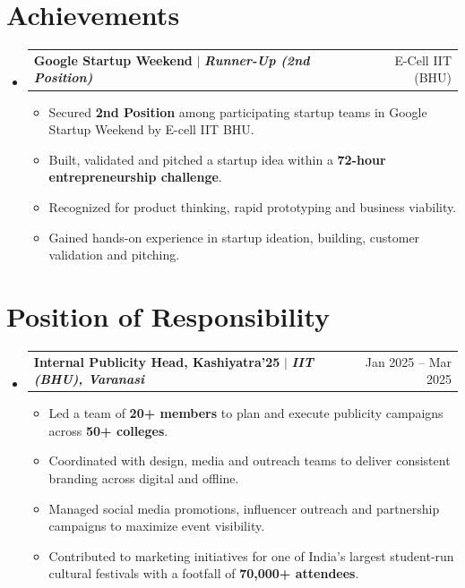 \documentclass[letterpaper,11pt]{article}
\makeatletter
\newcommand{\resumeItem}[1]{
  \item\small{
    {#1 \vspace{-2pt}}
  }
}
\newcommand{\resumeProjectHeading}[2]{
    \item
    \begin{tabular*}{0.97\textwidth}{l@{\extracolsep{\fill}}r}
      \small#1 & #2 \\
    \end{tabular*}\vspace{-7pt}
}
\newcommand{\resumeSubHeadingListStart}{\begin{itemize}[leftmargin=0.15in, label={}]}
\newcommand{\resumeSubHeadingListEnd}{\end{itemize}}
\newcommand{\resumeItemListStart}{\begin{itemize}}
\newcommand{\resumeItemListEnd}{\end{itemize}\vspace{-5pt}}
\makeatother
\begin{document}
\section{Achievements}
\resumeSubHeadingListStart

\resumeProjectHeading
{\textbf{\large{Google Startup Weekend}} $|$ \emph{\textbf{Runner-Up (2nd Position)}}}
{E-Cell IIT (BHU)}

\resumeItemListStart
    \resumeItem{Secured \textbf{2nd Position} among participating startup teams in Google Startup Weekend by E-cell IIT BHU.}
    \resumeItem{Built, validated and pitched a startup idea within a \textbf{72-hour entrepreneurship challenge}.}
    \resumeItem{Recognized for product thinking, rapid prototyping and business viability.}
    \resumeItem{Gained hands-on experience in startup ideation, building, customer validation and pitching.}
\resumeItemListEnd
\resumeSubHeadingListEnd

\section{Position of Responsibility}
\resumeSubHeadingListStart

\resumeProjectHeading
{\textbf{\large{Internal Publicity Head, Kashiyatra'25}} $|$ \emph{\textbf{IIT (BHU), Varanasi}}}
{Jan 2025 -- Mar 2025}

\resumeItemListStart
    \resumeItem{Led a team of \textbf{20+ members} to plan and execute publicity campaigns across \textbf{50+ colleges}.}
    \resumeItem{Coordinated with design, media and outreach teams to deliver consistent branding across digital and offline.}
    \resumeItem{Managed social media promotions, influencer outreach and partnership campaigns to maximize event visibility.}
    \resumeItem{Contributed to marketing initiatives for one of India's largest student-run cultural festivals with a footfall of \textbf{70,000+ attendees}.}
\resumeItemListEnd

\resumeSubHeadingListEnd
\end{document}

